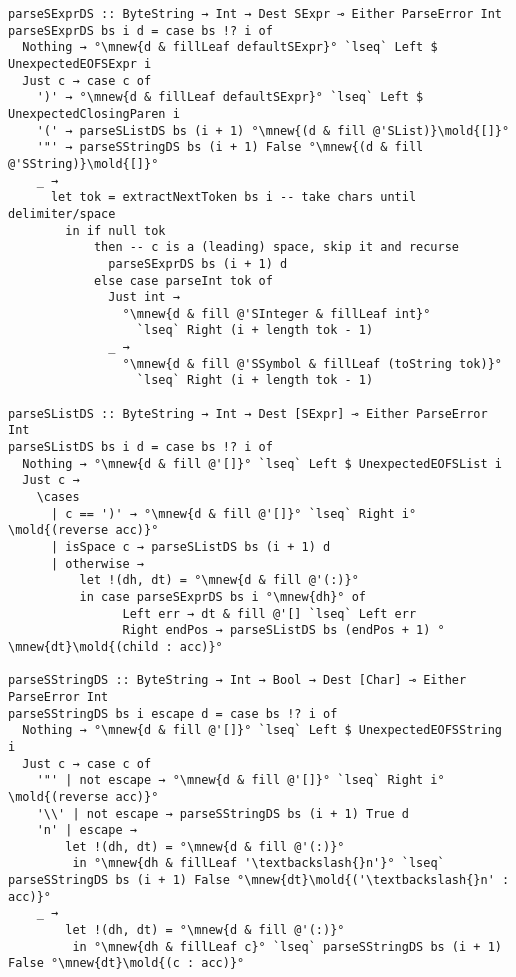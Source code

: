 \documentclass[english]{jflart}
\begin{document}
\newcommand{\mnew}[1]{\colorbox{green}{#1}}
\newcommand{\mold}[1]{\colorbox{red}{\sout{#1}}}

\begin{verbatim}
parseSExprDS :: ByteString → Int → Dest SExpr ⊸ Either ParseError Int
parseSExprDS bs i d = case bs !? i of
  Nothing → °\mnew{d & fillLeaf defaultSExpr}° `lseq` Left $ UnexpectedEOFSExpr i
  Just c → case c of
    ')' → °\mnew{d & fillLeaf defaultSExpr}° `lseq` Left $ UnexpectedClosingParen i
    '(' → parseSListDS bs (i + 1) °\mnew{(d & fill @'SList)}\mold{[]}°
    '"' → parseSStringDS bs (i + 1) False °\mnew{(d & fill @'SString)}\mold{[]}°
    _ →
      let tok = extractNextToken bs i -- take chars until delimiter/space
        in if null tok
            then -- c is a (leading) space, skip it and recurse
              parseSExprDS bs (i + 1) d
            else case parseInt tok of
              Just int →
                °\mnew{d & fill @'SInteger & fillLeaf int}°
                  `lseq` Right (i + length tok - 1)
              _ →
                °\mnew{d & fill @'SSymbol & fillLeaf (toString tok)}°
                  `lseq` Right (i + length tok - 1)

parseSListDS :: ByteString → Int → Dest [SExpr] ⊸ Either ParseError Int
parseSListDS bs i d = case bs !? i of
  Nothing → °\mnew{d & fill @'[]}° `lseq` Left $ UnexpectedEOFSList i
  Just c →
    \cases
      | c == ')' → °\mnew{d & fill @'[]}° `lseq` Right i°\mold{(reverse acc)}°
      | isSpace c → parseSListDS bs (i + 1) d
      | otherwise →
          let !(dh, dt) = °\mnew{d & fill @'(:)}°
          in case parseSExprDS bs i °\mnew{dh}° of
                Left err → dt & fill @'[] `lseq` Left err
                Right endPos → parseSListDS bs (endPos + 1) °\mnew{dt}\mold{(child : acc)}°

parseSStringDS :: ByteString → Int → Bool → Dest [Char] ⊸ Either ParseError Int
parseSStringDS bs i escape d = case bs !? i of
  Nothing → °\mnew{d & fill @'[]}° `lseq` Left $ UnexpectedEOFSString i
  Just c → case c of
    '"' | not escape → °\mnew{d & fill @'[]}° `lseq` Right i°\mold{(reverse acc)}°
    '\\' | not escape → parseSStringDS bs (i + 1) True d
    'n' | escape →
        let !(dh, dt) = °\mnew{d & fill @'(:)}°
         in °\mnew{dh & fillLeaf '\textbackslash{}n'}° `lseq` parseSStringDS bs (i + 1) False °\mnew{dt}\mold{('\textbackslash{}n' : acc)}°
    _ →
        let !(dh, dt) = °\mnew{d & fill @'(:)}°
         in °\mnew{dh & fillLeaf c}° `lseq` parseSStringDS bs (i + 1) False °\mnew{dt}\mold{(c : acc)}°
\end{verbatim}
\end{document}

